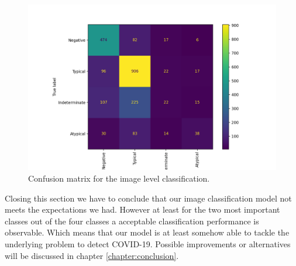 \begin{figure}
	\centering
	\includegraphics[width=.7\linewidth]{img/confusion_study_58.png}
	\caption{Confusion matrix for the image level classification.}
	\label{fig:study-confusion-matrix}
\end{figure}
Closing this section we have to conclude that our image classification model not meets the expectations we had. However at least for the two most important classes out of the four classes a acceptable classification performance is observable. Which means that our model is at least somehow able to tackle the underlying problem to detect COVID-19. Possible improvements or alternatives will be discussed in chapter \ref{chapter:conclusion}.
